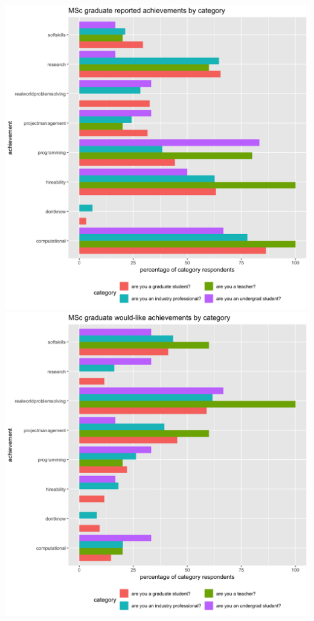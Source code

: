 \documentclass{sigchi}
\begin{document}
\includegraphics[scale=0.2]{../data-analysis/plots_output/MSc_graduate_reported_achievements_by_category.png}
\includegraphics[scale=0.2]{../data-analysis/plots_output/MSc_graduate_would-like_achievements_by_category.png}
\end{document}
